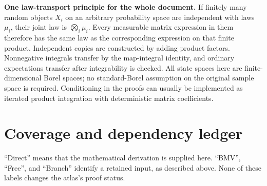 \documentclass[11pt,a4paper]{article}
\begin{document}
\textbf{One law-transport principle for the whole document.} If finitely
many random objects $X_i$ on an arbitrary probability space are independent
with laws $\mu_i$, their joint law is $\bigotimes_i\mu_i$. Every measurable
matrix expression in them therefore has the same law as the corresponding
expression on that finite product. Independent copies are constructed by
adding product factors. Nonnegative integrals transfer by the map-integral
identity, and ordinary expectations transfer after integrability is checked.
All state spaces here are finite-dimensional Borel spaces; no
standard-Borel assumption on the original sample space is required.
Conditioning in the proofs can usually be implemented as iterated product
integration with deterministic matrix coefficients.

\tableofcontents
\clearpage
\section*{Coverage and dependency ledger}
``Direct'' means that the mathematical derivation is supplied here.
``BMV'', ``Free'', and ``Branch'' identify a retained input, as described
above. None of these labels changes the atlas's proof status.
\small
\end{document}
